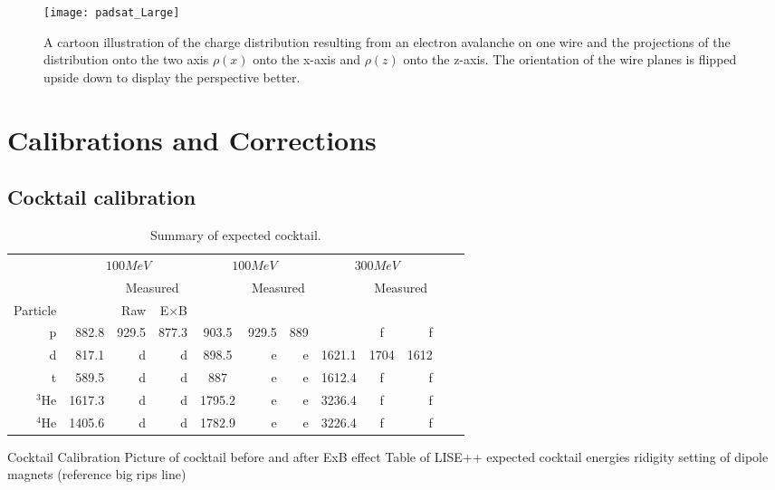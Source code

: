 \begin{figure}[H]
\texttt{[image: padsat\_Large]}
\caption{A cartoon illustration of the charge distribution resulting from an electron avalanche on one wire and the projections of the distribution onto the two axis $\rho(x)$ onto the x-axis and $\rho(z)$ onto the z-axis. The orientation of the wire planes is flipped upside down to display the perspective better.}
\label{fig:prf}
\end{figure}



\section{Calibrations and Corrections}


\subsection{Cocktail calibration}

\begin{table*}\centering
{}
\begin{tabular}{@{}rrrrcrrrcrrr@{}}\toprule
& \multicolumn{3}{c}{$100 MeV$} & \multicolumn{3}{c}{$100 MeV$} & \multicolumn{3}{c}{$300 MeV$}\\
\cmidrule{2-4} \cmidrule{6-8} \cmidrule{10-12}
& &\multicolumn{2}{c}{Measured} & & \multicolumn{2}{c}{Measured} & & \multicolumn{2}{c}{Measured}\\
\cmidrule{3-4} \cmidrule{7-8} \cmidrule{11-12}
Particle &\phantom{abc} & Raw & E$\times$B\\
\midrule
p   & 882.8 & 929.5 & 877.3 & 903.5 & 929.5 & 889 &\phantom{abcdef} & f & f \\
d   & 817.1 & d & d & 898.5 & e & e & 1621.1 & 1704 & 1612\\
t   & 589.5 & d & d & 887 & e & e & 1612.4 & f & f  \\
$^{3}$He  & 1617.3  & d & d & 1795.2 & e & e & 3236.4 & f & f\\
$^{4}$He  & 1405.6  & d & d & 1782.9 & e & e & 3226.4 & f & f \\
\bottomrule
\end{tabular}
\caption{Summary of expected cocktail. }
\label{tb:cocktailsummary}
\end{table*}

Cocktail Calibration 
Picture of cocktail before and after ExB effect
Table of LISE++ expected cocktail energies ridigity setting of dipole magnets (reference big rips line)



